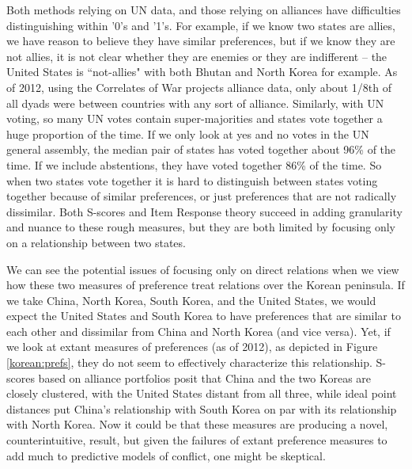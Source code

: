 \documentclass[12pt,pdflatex]{elsarticle}
\begin{document}
Both methods relying on UN data, and those relying on alliances have difficulties distinguishing within '0's and '1's. For example, if we know two states are allies, we have reason to believe they have similar preferences, but if we know they are not allies, it is not clear whether they are enemies or they are indifferent -- the United States is ``not-allies" with both Bhutan and North Korea for example. As of 2012, using the Correlates of War projects alliance data, only about 1/8th of all dyads were between countries with any sort of alliance. Similarly, with UN voting, so many UN votes contain super-majorities and states vote together a huge proportion of the time. If we only look at yes and no votes in the UN general assembly, the median pair of states has voted together about 96\% of the time. If we include abstentions,  they have voted together 86\% of the time. So when two states vote together it is hard to distinguish between states voting together because of similar preferences, or just preferences that are not radically dissimilar. Both S-scores and Item Response theory succeed in adding granularity and nuance to these rough measures, but they are both limited by focusing only on a relationship between two states.

We can see the potential issues of focusing only on direct relations when we view how these two measures of preference treat relations over the Korean peninsula. If we take China, North Korea, South Korea, and the United States, we would expect the United States and South Korea to have preferences that are similar to each other and dissimilar from China and North Korea (and vice versa). Yet, if we look at extant measures of preferences (as of 2012), as depicted in Figure \ref{korean:prefs}, they do not seem to effectively characterize this relationship. S-scores based on alliance portfolios posit that China and the two Koreas are closely clustered, with the United States distant from all three, while ideal point distances put China's relationship with South Korea on par with its relationship with North Korea. Now it could be that these measures are producing a novel, counterintuitive, result, but given the failures of extant preference measures to add much to predictive models of conflict, one might be skeptical.
\end{document}
